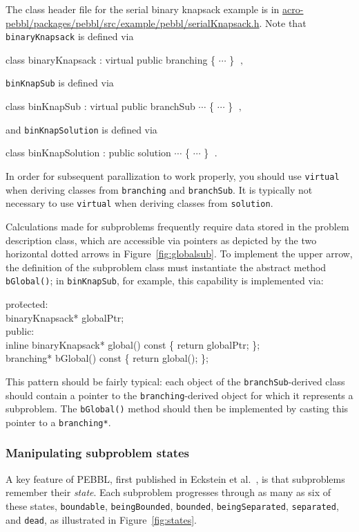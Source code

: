 The class header file for the serial binary knapsack example is in
\url{acro-pebbl/packages/pebbl/src/example/pebbl/serialKnapsack.h}. Note that
\texttt{binaryKnapsack} is defined via
\begin{codeblock}
class binaryKnapsack : virtual public branching \{ $\cdots$ \}
$\;,$
\end{codeblock}
\texttt{binKnapSub} is defined via
\begin{codeblock}
class binKnapSub : virtual public branchSub $\cdots$ \{ $\cdots$ \}
$\;,$
\end{codeblock}
and \texttt{binKnapSolution} is defined via
\begin{codeblock}
class binKnapSolution : public solution $\cdots$ \{ $\cdots$ \} $\;.$
\end{codeblock}
In order for subsequent parallization to work properly, you should use
\texttt{virtual} when deriving classes from \texttt{branching} and
\texttt{branchSub}.  It is typically not necessary to use
\texttt{virtual} when deriving classes from \texttt{solution}.

Calculations made for subproblems frequently require data
stored in the problem description class, which are accessible via
pointers as depicted by the two horizontal dotted arrows in
Figure~\ref{fig:globalsub}.  To implement the upper arrow, the
definition of the subproblem class must instantiate the abstract
method \texttt{bGlobal()}; in \texttt{binKnapSub}, for example, this
capability is implemented via:
\begin{codeblock}
pro\=tected: \\
\>  binaryKnapsack* globalPtr;\\
public:\\
\>  inline binaryKnapsack* global() const \{ return globalPtr; \};\\
\>  branching* bGlobal() const \{ return global(); \};\\
\end{codeblock}
This pattern should be fairly typical: each object of the
\texttt{branchSub}-derived class should contain a pointer to the
\texttt{branching}-derived object for which it represents a
subproblem.  The \texttt{bGlobal()} method should then be implemented
by casting this pointer to a \texttt{branching*}.


\subsubsection{Manipulating subproblem states}
A key feature of PEBBL, first published in Eckstein et al.~\cite{EPH00}, is that
subproblems remember their \emph{state}.  Each subproblem progresses
through as many as six of these states, \texttt{boundable},
\texttt{beingBounded}, \texttt{bounded}, \texttt{beingSeparated}, 
\texttt{separated}, and \texttt{dead}, as illustrated in
Figure~\ref{fig:states}.


